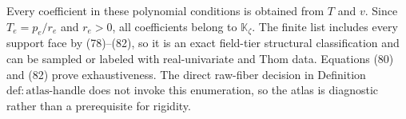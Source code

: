 Every coefficient in these polynomial conditions is obtained from \(T\) and \(v\).  Since \(T_e=p_e/r_e\) and \(r_e>0\), all coefficients belong to \(\mathbb K_{\zeta}\).  The finite list includes every support face by (78)--(82), so it is an exact field-tier structural classification and can be sampled or labeled with real-univariate and Thom data.  Equations (80) and (82) prove exhaustiveness.  The direct raw-fiber decision in Definition \(\mathrm{def{:}atlas\text{-}handle}\) does not invoke this enumeration, so the atlas is diagnostic rather than a prerequisite for rigidity.
